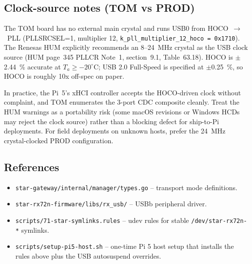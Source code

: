 \subsection{Clock-source notes (TOM vs PROD)}

The TOM board has no external main crystal and runs USB0 from
HOCO~$\rightarrow$~PLL (PLLSRCSEL=1, multiplier 12,
\texttt{k\_pll\_multiplier\_12\_hoco = 0x1710}). The Renesas HUM
explicitly recommends an 8--24~MHz crystal as the USB clock source
(HUM page~345 PLLCR Note~1, section~9.1, Table~63.18). HOCO is
$\pm$2.44~\% accurate at $T_a \ge -20^\circ$C; USB 2.0 Full-Speed is
specified at $\pm$0.25~\%, so HOCO is roughly 10x off-spec on paper.

In practice, the Pi~5's xHCI controller accepts the HOCO-driven clock
without complaint, and TOM enumerates the 3-port CDC composite
cleanly. Treat the HUM warnings as a portability risk (some macOS
revisions or Windows HCDs may reject the clock source) rather than a
blocking defect for ship-to-Pi deployments. For field deployments on
unknown hosts, prefer the 24~MHz crystal-clocked PROD configuration.

\subsection{References}

\begin{itemize}
  \item \texttt{star-gateway/internal/manager/types.go} -- transport
        mode definitions.
  \item \texttt{star-rx72n-firmware/libs/rx\_usb/} -- USBb peripheral
        driver.
  \item \texttt{scripts/71-star-symlinks.rules} -- udev rules for
        stable \texttt{/dev/star-rx72n-*} symlinks.
  \item \texttt{scripts/setup-pi5-host.sh} -- one-time Pi 5 host
        setup that installs the rules above plus the USB
        autosuspend overrides.
\end{itemize}
